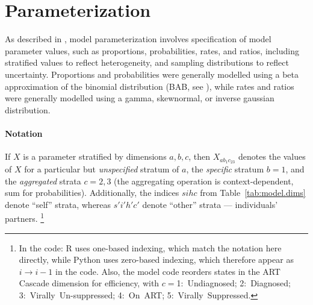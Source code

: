 \section{Parameterization}\label{model.par}
As described in , model parameterization involves
specification of model parameter values, such as proportions, probabilities, rates, and ratios,
including stratified values to reflect heterogeneity,
and sampling distributions to reflect uncertainty.
Proportions and probabilities were generally modelled using
a beta approximation of the binomial distribution (BAB, see ),
while rates and ratios were generally modelled using
a gamma, skewnormal, or inverse gaussian distribution.
\paragraph{Notation}
If $X$ is a parameter stratified by dimensions $a,b,c$,
then $X_{ab_{1}c_{23}}$ denotes the values of $X$ for
a particular but \emph{unspecified} stratum of $a$,
the \emph{specific} stratum $b = 1$,
and the \emph{aggregated} strata $c = 2,3$
(the aggregating operation is context-dependent, \eg sum for probabilities).
Additionally, the indices $sihc$ from Table~\ref{tab:model.dims} denote ``self'' strata,
whereas $s'i'h'c'$ denote ``other'' strata --- \ie individuals' partners.%
\footnote{\label{foot:code.note}%
  In the code: R uses one-based indexing, which match the notation here directly,
  while Python uses zero-based indexing, which therefore appear as $i \rightarrow i-1$ in the code.
  Also, the model code reorders states in the ART Cascade dimension for efficiency,
  with $c={}$1:~Undiagnosed; 2:~Diagnosed; 3:~Virally~Un-suppressed; 4:~On~ART; 5:~Virally~Suppressed.}



